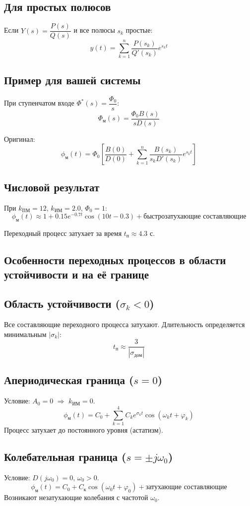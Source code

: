 \documentclass[14pt]{extreport}
\begin{document}
{\subsection*{Для простых полюсов}
Если $Y(s) = \dfrac{P(s)}{Q(s)}$ и все полюсы $s_k$ простые:
\[
y(t) = \sum_{k=1}^{n} \frac{P(s_k)}{Q'(s_k)} e^{s_k t}
\]

\subsection*{Пример для вашей системы}
При ступенчатом входе $\Phi^*(s) = \dfrac{\Phi_0}{s}$:
\[
\Phi_{\text{м}}(s) = \frac{\Phi_0 B(s)}{s D(s)}
\]

Оригинал:
\[
\phi_{\text{м}}(t) = \Phi_0 \left[ \frac{B(0)}{D(0)} + \sum_{k=1}^{n} \frac{B(s_k)}{s_k D'(s_k)} e^{s_k t} \right]
\]

\subsection*{Числовой результат}
При $k_{\text{ПМ}} = 12$, $k_{\text{ИМ}} = 2.0$, $\Phi_0 = 1$:
\[
\phi_{\text{м}}(t) \approx 1 + 0.15 e^{-0.7t} \cos(10t - 0.3) + \text{быстрозатухающие составляющие}
\]

Переходный процесс затухает за время $t_{\text{п}} \approx 4.3$ с.

        \subsection{Особенности переходных процессов в области устойчивости и на её границе}
        \subsection*{Область устойчивости ($\sigma_k < 0$)}
Все составляющие переходного процесса затухают. Длительность определяется минимальным $|\sigma_k|$:
\[
t_{\text{п}} \approx \frac{3}{|\sigma_{\text{дом}}|}
\]

\subsection*{Апериодическая граница ($s = 0$)}
Условие: $A_0 = 0$ $\Rightarrow$ $k_{\text{ИМ}} = 0$.
\[
\phi_{\text{м}}(t) = C_0 + \sum_{k=1}^{4} C_k e^{\sigma_k t} \cos(\omega_k t + \varphi_k)
\]
Процесс затухает до постоянного уровня (астатизм).

\subsection*{Колебательная граница ($s = \pm j\omega_0$)}
Условие: $D(j\omega_0) = 0$, $\omega_0 > 0$.
\[
\phi_{\text{м}}(t) = C_0 + C_{\text{к}} \cos(\omega_0 t + \varphi_0) + \text{затухающие составляющие}
\]
Возникают незатухающие колебания с частотой $\omega_0$.

}
\end{document}
